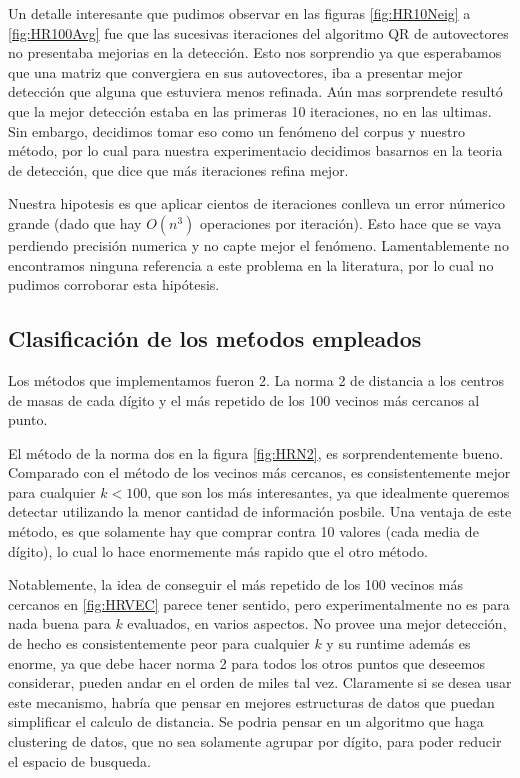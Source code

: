 Un detalle interesante que pudimos observar en las figuras \ref{fig:HR10Neig} a
\ref{fig:HR100Avg} fue que las sucesivas iteraciones del algoritmo QR de
autovectores no presentaba mejorias en la detecci\'on. Esto nos sorprendio
ya que esperabamos que una matriz que convergiera en sus autovectores,
iba a presentar mejor detecci\'on que alguna que estuviera menos refinada.
A\'un mas sorprendete result\'o que la mejor detecci\'on estaba en las primeras 10
iteraciones, no en las ultimas. Sin embargo, decidimos tomar eso como un fen\'omeno
del corpus y nuestro m\'etodo, por lo cual para nuestra experimentacio decidimos
basarnos en la teoria de detecci\'on, que dice que m\'as iteraciones refina mejor. 

Nuestra hipotesis es que aplicar cientos de iteraciones conlleva un error
n\'umerico grande (dado que hay $O(n^3)$ operaciones por iteraci\'on). Esto
hace que se vaya perdiendo precisi\'on numerica y no capte mejor el fen\'omeno.
Lamentablemente no encontramos ninguna referencia a este problema en la literatura,
por lo cual no pudimos corroborar esta hip\'otesis. 


\subsection{Clasificaci\'on de los me\'todos empleados}
Los m\'etodos que implementamos fueron 2. La norma 2 de distancia a
los centros de masas de cada d\'igito y el m\'as repetido de los 100 vecinos m\'as cercanos al punto.

El m\'etodo de la norma dos en la figura \ref{fig:HRN2}, es sorprendentemente bueno. Comparado con el m\'etodo de
los vecinos m\'as cercanos, es consistentemente mejor para cualquier $k<100$, que son los m\'as
interesantes, ya que idealmente queremos detectar utilizando la menor cantidad de informaci\'on posbile. Una ventaja
de este m\'etodo, es que solamente hay que comprar contra 10 valores (cada media de d\'igito), lo cual lo hace enormemente
m\'as rapido que el otro m\'etodo.

Notablemente, la idea de conseguir el m\'as repetido de los 100 vecinos m\'as cercanos en \ref{fig:HRVEC}
parece tener sentido, pero experimentalmente no es para nada buena para $k$ evaluados, en varios aspectos.
No provee una mejor detecci\'on, de hecho es consistentemente peor para cualquier $k$ y su runtime adem\'as es enorme,
ya que debe hacer norma 2 para todos los otros puntos que deseemos considerar, pueden andar en el orden de miles tal vez.
Claramente si se desea usar este mecanismo, habr\'ia que pensar en mejores estructuras
de datos que puedan simplificar el calculo de distancia. Se podria pensar en un algoritmo
que haga clustering de datos, que no sea solamente agrupar por d\'igito, para poder reducir
el espacio de busqueda.


